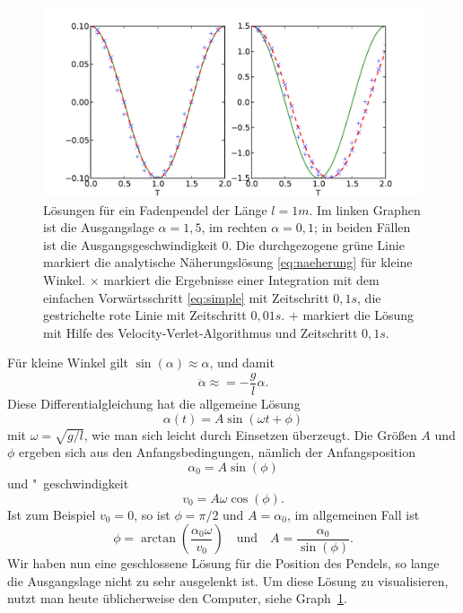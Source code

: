 \begin{figure}
  \centering
  \includegraphics[width=\textwidth]{plots/pendel_loesung}
  \caption{Lösungen für ein Fadenpendel der Länge $l=1m$. Im linken Graphen
    ist die Ausgangslage $\alpha=1,5$, im rechten $\alpha=0,1$; in
    beiden Fällen ist die Ausgangsgeschwindigkeit 0. Die durchgezogene
  grüne Linie markiert die analytische Näherungslösung
  \eqref{eq:naeherung} für kleine Winkel. $\times$ markiert die
  Ergebnisse einer Integration mit dem einfachen Vorwärtsschritt
  \eqref{eq:simple} mit Zeitschritt $0,1s$, die gestrichelte rote
  Linie mit Zeitschritt $0,01s$. $+$ markiert die Lösung mit Hilfe des
  Velocity-Verlet-Algorithmus und Zeitschritt $0,1s$.}
  \label{fig:loesung}
\end{figure}

Für kleine Winkel gilt $\sin(\alpha)\approx\alpha$, und damit
\begin{equation}
  \ddot\alpha \approx = -\frac{g}{l}\alpha.
\end{equation}
Diese Differentialgleichung hat die allgemeine Lösung
\begin{equation}
  \alpha(t) = A \sin(\omega t + \phi)
  \label{eq:naeherung}
\end{equation}
mit $\omega=\sqrt{g/l}$, wie man sich leicht durch Einsetzen
überzeugt. Die Größen $A$ und $\phi$ ergeben sich aus den
Anfangsbedingungen, nämlich der Anfangsposition
\begin{equation}
  \alpha_0 = A \sin(\phi)
\end{equation}
und "~geschwindigkeit
\begin{equation}
  v_0 = A \omega \cos(\phi).
\end{equation}
Ist zum Beispiel $v_0=0$, so ist $\phi=\pi/2$ und $A=\alpha_0$, im
allgemeinen Fall ist
\begin{equation}
\phi =
\arctan\left(\frac{\alpha_0\omega}{v_0}\right)\quad\text{und}\quad
A = \frac{\alpha_0}{\sin(\phi)}.
\end{equation}
Wir haben nun eine geschlossene Lösung für die Position des Pendels,
so lange die Ausgangslage nicht zu sehr ausgelenkt ist. Um diese
Lösung zu visualisieren, nutzt man heute üblicherweise den Computer,
siehe Graph~\ref{fig:loesung}.

